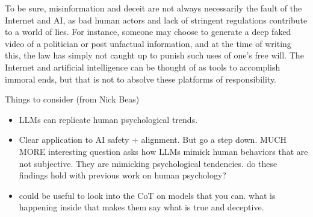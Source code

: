 \documentclass{article}
\begin{document}
To be sure, misinformation and deceit are not always necessarily the fault of the Internet and AI, as bad human actors and lack of stringent regulations contribute to a world of lies. For instance, someone may choose to generate a deep faked video of a politician or post unfactual information, and at the time of writing this, the law has simply not caught up to punish such uses of one’s free will. The Internet and artificial intelligence can be thought of as tools to accomplish immoral ends, but that is not to absolve these platforms of responsibility.

Things to consider (from Nick Beas)
\begin{itemize}
    \item LLMs can replicate human psychological trends.
    \item Clear application to AI safety + alignment. But go a step down. MUCH MORE interesting question asks how LLMs mimick human behaviors that are not subjective. They are mimicking psychological tendencies. do these findings hold with previous work on human psychology?
    \item could be useful to look into the CoT on models that you can. what is happening inside that makes them say what is true and deceptive.
\end{itemize}



\end{document}
